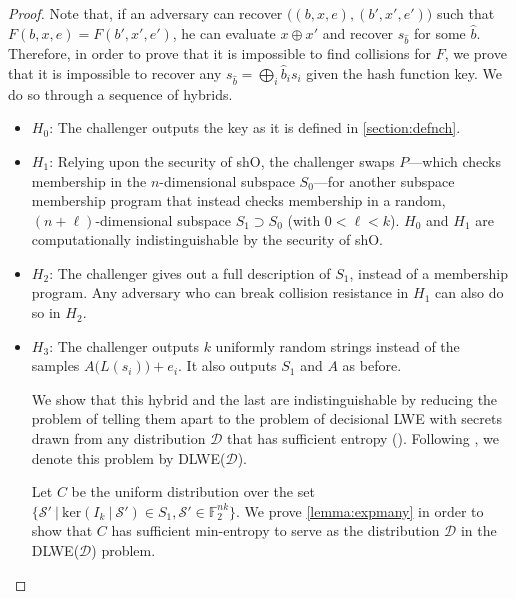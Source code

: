 \documentclass{article}
\begin{document}
\begin{proof}
Note that, if an adversary can recover $\big( (b, x, e), (b', x', e') \big)$ such that $F(b, x, e) = F(b', x', e')$, he can evaluate $x \oplus x'$ and recover $s_{\hat b}$ for some $\hat b$. Therefore, in order to prove that it is impossible to find collisions for $F$, we prove that it is impossible to recover any $s_{\hat b} = \bigoplus_i \hat b_is_i$ given the hash function key. We do so through a sequence of hybrids.

\begin{itemize}
    \item $H_0$: The challenger outputs the key as it is defined in \cref{section:defnch}.
    \item $H_1$: Relying upon the security of \textsf{shO}, the challenger swaps $P$---which checks membership in the $n$-dimensional subspace $S_0$---for another subspace membership program that instead checks membership in a random, $(n+\ell)$-dimensional subspace $S_1 \supset S_0$ (with $0 < \ell < k$). $H_0$ and $H_1$ are computationally indistinguishable by the security of \textsf{shO}.
    \item $H_2$: The challenger gives out a full description of $S_1$, instead of a membership program. Any adversary who can break collision resistance in $H_1$ can also do so in $H_2$.
    \item $H_3$: The challenger outputs $k$ uniformly random strings instead of the samples $A\big( L(s_i) \big) + e_i$. It also outputs $S_1$ and $A$ as before.

We show that this hybrid and the last are indistinguishable by reducing the problem of telling them apart to the problem of decisional LWE with secrets drawn from any distribution $\mathcal{D}$ that has sufficient entropy (\cite{robustness}). Following \cite{robustness}, we denote this problem by \textsf{DLWE}($\mathcal{D}$).

Let $C$ be the uniform distribution over the set $\big\{ \mathcal{S}' \:\big|\: \mathrm{ker}(I_k \:|\: \mathcal{S}') \in S_1, \mathcal{S}' \in \mathbb{F}_2^{nk} \big\}$. We prove \cref{lemma:expmany} in order to show that $C$ has sufficient min-entropy to serve as the distribution $\mathcal{D}$ in the \textsf{DLWE}($\mathcal{D}$) problem.


\end{itemize}
\end{proof}
\end{document}
